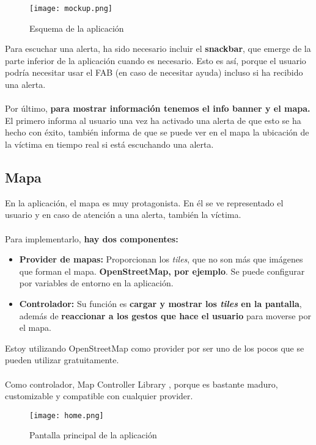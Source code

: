 \begin{figure}[H]
	\centering	
	\texttt{[image: mockup.png]}
	\caption{Esquema de la aplicación}
	\end{figure}

Para escuchar una alerta, ha sido necesario incluir el \textbf{snackbar}, que emerge de la parte inferior de la aplicación cuando es necesario.
Esto es así, porque el usuario podría necesitar usar el FAB (en caso de necesitar ayuda) incluso si ha recibido una alerta. \\ \\

Por último, \textbf{para mostrar información tenemos el info banner y el mapa.} El primero informa al usuario una vez ha activado
una alerta de que esto se ha hecho con éxito, también informa de que se puede ver en el mapa la ubicación de la víctima en tiempo real
si está escuchando una alerta.

\subsection{Mapa}
En la aplicación, el mapa es muy protagonista. En él se ve representado el usuario y en caso de
atención a una alerta, también la víctima. \\ \\
Para implementarlo, \textbf{hay dos componentes:}
 \begin{itemize}
   \item \textbf{Provider de mapas:} Proporcionan los \textit{tiles}, que no son más que imágenes que forman el mapa. \textbf{OpenStreetMap, por ejemplo}. Se puede configurar por variables de entorno en la aplicación.
   \item \textbf{Controlador:} Su función es \textbf{cargar y mostrar los \textit{tiles} en la pantalla}, además de \textbf{reaccionar a los gestos que hace el usuario} para moverse por el mapa. 
 \end{itemize}

 Estoy utilizando OpenStreetMap como provider \cite{openstreetmap} por ser uno de los pocos que se pueden utilizar gratuitamente. \\ \\
 Como controlador, Map Controller Library \cite{map}, porque es bastante maduro, customizable y compatible con cualquier provider.

\begin{figure}[H]
	\centering	
	\texttt{[image: home.png]}
	\caption{Pantalla principal de la aplicación}
	\end{figure}

